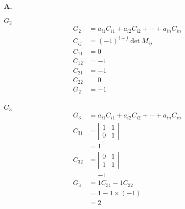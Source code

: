 \documentclass[main.tex]{subfiles}
\begin{document}
\begin{enumerate}
    \textbf{A.}
    
    $G_{2}$
    $$
    \begin{aligned}
    G_{2}&=a_{i 1} C_{i 1}+a_{i 2} C_{i 2}+\cdots+a_{i n} C_{i n}\\
    C_{i j}&=(-1)^{i+j} \operatorname{det} M_{i j}\\
    C_{11}&=0 \\
    C_{12}&=-1 \\
    C_{21}&=-1 \\
    C_{22}&=0 \\
    G_{2}&=-1 \\
    \end{aligned}
    $$
    
    $G_{3}$
    $$
    \begin{aligned}
    G_{3}&=a_{i 1} C_{i 1}+a_{i 2} C_{i 2}+\cdots+a_{i n} C_{i n}\\
    C_{31} &=\left|\begin{array}{ll}
    1 & 1 \\
    0 & 1
    \end{array}\right| \\
    &=1 \\
    C_{32} &=\left|\begin{array}{ll}
    0 & 1 \\
    1 & 1
    \end{array}\right| \\
    &=-1 \\
    G_{3} &=1 C_{31}-1 C_{32} \\
    &=1-1 \times(-1) \\
    &=2
    \end{aligned}
    $$
    

\end{enumerate}
\end{document}
